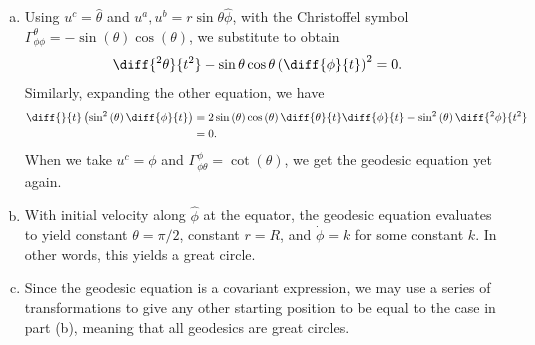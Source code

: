 \documentclass[10pt]{mypackage}
\begin{document}
\begin{solution}[30.28]\hfill
  \begin{enumerate}[(a)]
    \item Using $u^{c} = \hat{\theta}$ and $u^a,u^b = r\sin\theta \hat{\phi}$, with the Christoffel symbol $\Gamma_{\phi\phi}^{\theta} = -\sin\left( \theta \right)\cos\left( \theta \right)$, we substitute to obtain
      \begin{align*}
        \diff{^2\theta}{t^2} - \sin\theta\cos\theta \left( \diff{\phi}{t} \right)^2 &= 0.
      \end{align*}
      Similarly, expanding the other equation, we have
      \begin{align*}
        \diff{}{t}\left( \sin^2\left( \theta \right)\diff{\phi}{t} \right) &= 2\sin\left( \theta \right)\cos\left( \theta \right)\diff{\theta}{t}\diff{\phi}{t} - \sin^2\left( \theta \right)\diff{^2\phi}{t^2}\\
                                                                           &= 0.
      \end{align*}
      When we take $u^{c} = \phi$ and $\Gamma_{\phi\theta}^{\phi} = \cot\left( \theta \right)$, we get the geodesic equation yet again.
    \item With initial velocity along $\hat{\phi}$ at the equator, the geodesic equation evaluates to yield constant $\theta = \pi/2$, constant $r = R$, and $\dot{\phi} = k$ for some constant $k$. In other words, this yields a great circle.
    \item Since the geodesic equation is a covariant expression, we may use a series of transformations to give any other starting position to be equal to the case in part (b), meaning that all geodesics are great circles.
  \end{enumerate}
\end{solution}
\end{document}
